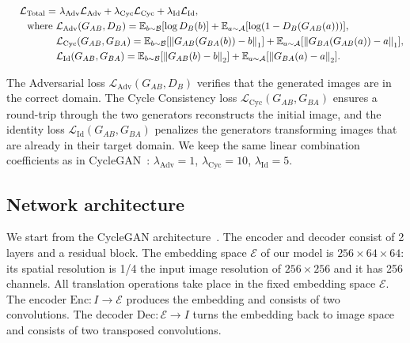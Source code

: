 \documentclass[a4paper,10pt]{extarticle}
\def\Ac{\mathcal A}
\def\Bc{\mathcal B}
\def\Ec{\mathcal E}
\begin{document}
\begin{align}
\mathcal{L}_\mathrm{Total} =  & \ 
\lambda_\mathrm{Adv}\mathcal{L}_\mathrm{Adv} + 
\lambda_\mathrm{Cyc}\mathcal{L}_\mathrm{Cyc} + 
\lambda_\mathrm{Id}\mathcal{L}_\mathrm{Id},    \\
\textrm{\quad \quad where } & \mathcal{L}_\mathrm{Adv}(G_{AB},D_{B})  =
\mathbb{E}_{b\sim \Bc}[\log D_{B}(b)]+ 
\mathbb{E}_{a\sim \Ac}[\log(1- D_{B}(G_{AB}(a)))], \nonumber \\
& \mathcal{L}_\mathrm{Cyc}(G_{AB},G_{BA}) =
\mathbb{E}_{b\sim \Bc}[\norm{G_{AB}(G_{BA}(b))-b}_1]+\mathbb{E}_{a\sim \Ac}[\norm{G_{BA}(G_{AB}(a))-a}_1], \nonumber  \\
& \mathcal{L}_\mathrm{Id}(G_{AB},G_{BA}) =
\mathbb{E}_{b\sim \Bc}[\norm{G_{AB}(b)-b}_2]+\mathbb{E}_{a\sim  \Ac}[\norm{G_{BA}(a)-a}_2]. \nonumber
\end{align}



The Adversarial loss $\mathcal{L}_\mathrm{Adv}(G_{AB},D_{B})$ verifies that the generated images are in the correct domain. The Cycle Consistency loss $ \mathcal{L}_\mathrm{Cyc}(G_{AB},G_{BA})$ ensures a round-trip through the two generators reconstructs the initial image, and the {identity loss} $ \mathcal{L}_\mathrm{Id}(G_{AB},G_{BA})$ penalizes the generators transforming images that are already in their target domain. We keep the same linear combination coefficients as in CycleGAN~\cite{Zhu2017CycleGAN}:
$\lambda_\mathrm{Adv}=1$, $\lambda_\mathrm{Cyc}=10$, $\lambda_\mathrm{Id}=5$.

\newcommand{\Enc}{\mathrm{Enc}}
\newcommand{\Dec}{\mathrm{Dec}}
\newcommand{\res}{\mathrm{res}}

\subsection{Network architecture}
\label{sec:arch}

We start from the CycleGAN architecture~\cite{Zhu2017CycleGAN}. 
The encoder and decoder consist of 2 layers and a residual block. 
The embedding space $\Ec$ of our model is $256 \times 64 \times 64$: its spatial resolution is 1/4 the input image resolution of $256\times256$ and it has 256 channels.
All translation operations take place in the fixed embedding space $\Ec$.
The encoder $\Enc: I \rightarrow \Ec$ produces the embedding and consists of two convolutions. 
The decoder $\Dec: \Ec \rightarrow I$ turns the embedding back to image space and consists of two transposed convolutions.
\end{document}
